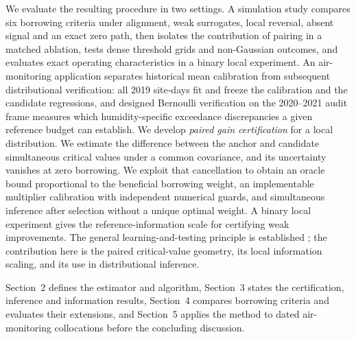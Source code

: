We evaluate the resulting procedure in two settings. A simulation study compares six borrowing criteria under alignment, weak surrogates, local reversal, absent signal and an exact zero path, then isolates the contribution of pairing in a matched ablation, tests dense threshold grids and non-Gaussian outcomes, and evaluates exact operating characteristics in a binary local experiment. An air-monitoring application separates historical mean calibration from subsequent distributional verification: all 2019 site-days fit and freeze the calibration and the candidate regressions, and designed Bernoulli verification on the 2020--2021 audit frame measures which humidity-specific exceedance discrepancies a given reference budget can establish.
We develop \emph{paired gain certification} for a local distribution. We estimate the difference between the anchor and candidate simultaneous critical values under a common covariance, and its uncertainty vanishes at zero borrowing. We exploit that cancellation to obtain an oracle bound proportional to the beneficial borrowing weight, an implementable multiplier calibration with independent numerical guards, and simultaneous inference after selection without a unique optimal weight. A binary local experiment gives the reference-information scale for certifying weak improvements. The general learning-and-testing principle is established \citep{angelopoulos2021learn}; the contribution here is the paired critical-value geometry, its local information scaling, and its use in distributional inference.

Section~2 defines the estimator and algorithm, Section~3 states the certification, inference and information results, Section~4 compares borrowing criteria and evaluates their extensions, and Section~5 applies the method to dated air-monitoring collocations before the concluding discussion.

